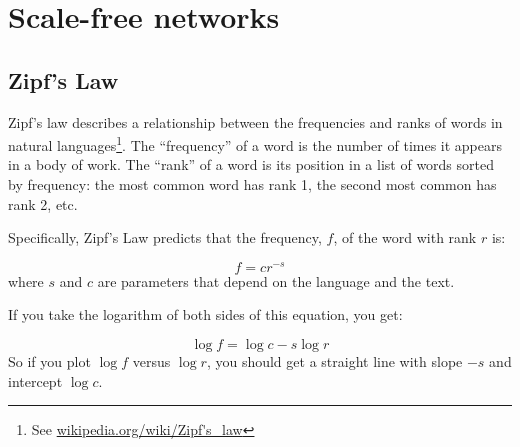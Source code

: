 \documentclass[10pt]{book}
\begin{document}
\chapter{Scale-free networks}

\section{Zipf's Law}

Zipf's law describes a relationship between the frequencies and ranks
of words in natural languages\footnote{See
  \url{wikipedia.org/wiki/Zipf's_law}}.  The ``frequency'' of
a word is the number of times it appears in a body of work.
The ``rank'' of a word is its position in a list of words
sorted by frequency: the most common word has rank 1, the
second most common has rank 2, etc.

Specifically, Zipf's Law
predicts that the frequency, $f$, of the word with rank $r$ is:

\[ f = c r^{-s} \]
%
where $s$ and $c$ are parameters that depend on the language and the
text.

If you take the logarithm of both sides of this equation, you get:


\[ \log f = \log c - s \log r \]
%
So if you plot $\log f$ versus $\log r$, you should get
a straight line with slope $-s$ and intercept $\log c$.
\end{document}
